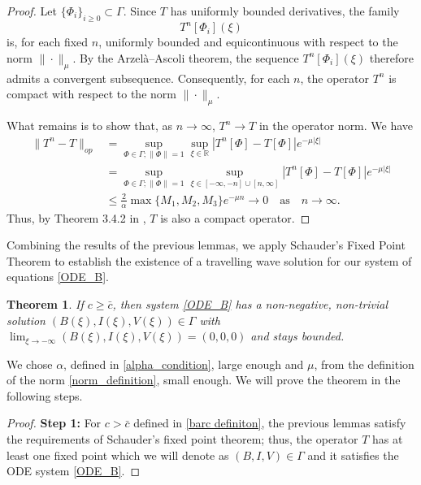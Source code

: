 \documentclass[11pt]{article}
\newtheorem{thm}{Theorem}[section]
\theoremstyle{definition}
\begin{document}
{\begin{proof}
Let $\{\Phi_i\}_{i \ge 0} \subset \Gamma$.  
Since $T$ has uniformly bounded derivatives, the family
\[
T^{n}[\Phi_i](\xi)
\]
is, for each fixed $n$, uniformly bounded and equicontinuous with respect to the norm $\|\cdot\|_{\mu}$.  
By the Arzelà--Ascoli theorem, the sequence $T^{n}[\Phi_i](\xi)$ therefore admits a convergent subsequence.  
Consequently, for each $n$, the operator $T^{n}$ is compact with respect to the norm $\|\cdot\|_{\mu}$.

What remains is to show that, as $n \to \infty$,
$
T^n \longrightarrow T
$
in the operator norm. We have
    \begin{align}
        \|T^n-T\|_{op}&= \underset{\Phi\in \Gamma;\|\Phi\|=1}{\sup} \underset{\xi \in \mathbb{R}}{ \sup } |T^n[\Phi]- T[\Phi]|e^{- \mu |\xi|} \\ &= \underset{\Phi\in \Gamma;\|\Phi\|=1}{\sup} \underset{\xi \in [-\infty,-n]\cup[n, \infty]}{ \sup } |T^n[\Phi]- T[\Phi]|e^{- \mu |\xi|}  \\ &\le \frac{2}{\alpha} \max \{ M_1,M_2,M_3\}e^{-\mu n} \to 0 \quad\text{as} \quad n \to \infty.
    \end{align}
    Thus, by Theorem 3.4.2 in \cite{Hillen_functional}, $T$ is also a compact operator.
\end{proof}
Combining the results of the previous lemmas, we apply Schauder's Fixed Point Theorem \cite{Hillen_functional} to establish the existence of a travelling wave solution for our system of equations \eqref{ODE_B}.
\begin{thm}
    If $c \ge \bar{c}$, then system \eqref{ODE_B} has a non-negative, non-trivial solution $(B(\xi),I(\xi),V(\xi))\in \Gamma $ with $\lim_{\xi \to - \infty}(B(\xi),I(\xi),V(\xi))=(0,0,0)$ and stays bounded.   
\end{thm}
We chose  $\alpha$, defined in \eqref{alpha_condition}, large enough and $\mu
    $, from the definition of the norm \eqref{norm_definition}, small enough. We will prove the theorem in the following steps.
\begin{proof}
    \textbf{Step 1:} For $c > \bar{c}$ defined in \eqref{barc definiton}, the previous lemmas satisfy the requirements of Schauder's fixed point theorem; thus, the operator $T$ has at least one fixed point which we will denote as $(B,I,V) \in \Gamma$ and it satisfies the ODE system \eqref{ODE_B}. 


\end{proof}}
\end{document}
